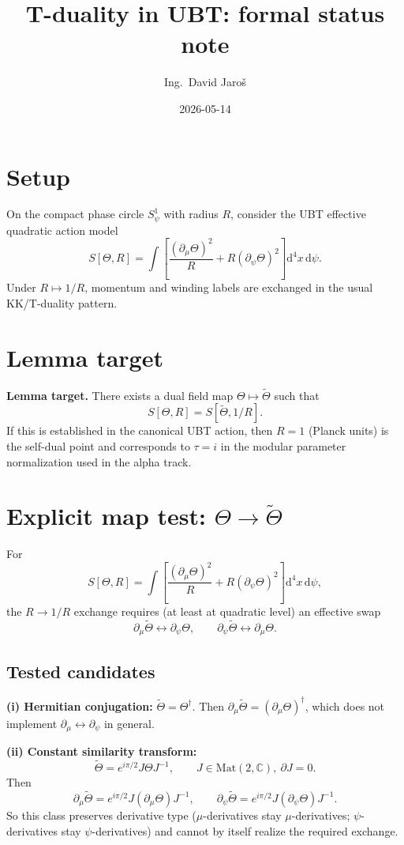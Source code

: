\documentclass[12pt,a4paper]{article}
\title{T-duality in UBT: formal status note}
\author{Ing.\ David Jaro\v{s}}
\date{2026-05-14}
\begin{document}
\maketitle

\section{Setup}
On the compact phase circle \(S^1_\psi\) with radius \(R\), consider the UBT
effective quadratic action model
\[
S[\Theta,R]=\int\!\left[\frac{(\partial_\mu\Theta)^2}{R}+R(\partial_\psi\Theta)^2\right]\mathrm{d}^4x\,\mathrm{d}\psi.
\]
Under \(R\mapsto 1/R\), momentum and winding labels are exchanged in the usual
KK/T-duality pattern.

\section{Lemma target}
\textbf{Lemma target.} There exists a dual field map \(\Theta\mapsto\widetilde\Theta\)
such that
\[
S[\Theta,R]=S[\widetilde\Theta,1/R].
\]
If this is established in the canonical UBT action, then \(R=1\) (Planck units)
is the self-dual point and corresponds to \(\tau=i\) in the modular parameter
normalization used in the alpha track.

\section{Explicit map test: \(\Theta\to\widetilde\Theta\)}
For
\[
S[\Theta,R]=\int\!\left[\frac{(\partial_\mu\Theta)^2}{R}+R(\partial_\psi\Theta)^2\right]\mathrm{d}^4x\,\mathrm{d}\psi,
\]
the \(R\to 1/R\) exchange requires (at least at quadratic level) an effective swap
\[
\partial_\mu\widetilde\Theta \leftrightarrow \partial_\psi\Theta,\qquad
\partial_\psi\widetilde\Theta \leftrightarrow \partial_\mu\Theta.
\]

\subsection*{Tested candidates}
\textbf{(i) Hermitian conjugation:} \(\widetilde\Theta=\Theta^\dagger\). Then
\(\partial_\mu\widetilde\Theta=(\partial_\mu\Theta)^\dagger\), which does not
implement \(\partial_\mu\leftrightarrow\partial_\psi\) in general.

\textbf{(ii) Constant similarity transform:}
\[
\widetilde\Theta=e^{i\pi/2}J\Theta J^{-1},\qquad J\in\mathrm{Mat}(2,\mathbb C),\ \partial J=0.
\]
Then
\[
\partial_\mu\widetilde\Theta=e^{i\pi/2}J(\partial_\mu\Theta)J^{-1},\qquad
\partial_\psi\widetilde\Theta=e^{i\pi/2}J(\partial_\psi\Theta)J^{-1}.
\]
So this class preserves derivative type (\(\mu\)-derivatives stay \(\mu\)-derivatives;
\(\psi\)-derivatives stay \(\psi\)-derivatives) and cannot by itself realize the
required exchange.
\end{document}
